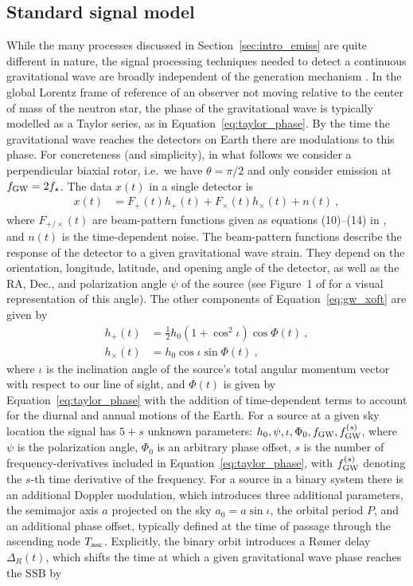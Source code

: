 \subsection{Standard signal model} \label{sec:intro_cwmethod}
While the many processes discussed in Section~\ref{sec:intro_emiss} are quite different in nature, the signal processing techniques needed to detect a continuous gravitational wave are broadly independent of the generation mechanism \citep{Owen2010,Riles2013a}. In the global Lorentz frame of reference of an observer not moving relative to the center of mass of the neutron star, the phase of the gravitational wave is typically modelled as a Taylor series, as in Equation~\eqref{eq:taylor_phase}. By the time the gravitational wave reaches the detectors on Earth there are modulations to this phase. For concreteness (and simplicity), in what follows we consider a perpendicular biaxial rotor, i.e.~we have $\theta = \pi/2$ and only consider emission at $f_{\rm GW} = 2f_\star$. The data $x(t)$ in a single detector is
\begin{align}
    x(t) &= F_+(t) h_+(t) + F_\times(t) h_\times(t) + n(t)\ ,\label{eq:gw_xoft}
\end{align}
where $F_{+/\times}(t)$ are beam-pattern functions given as equations (10)--(14) in \citet{JKS98}, and $n(t)$ is the time-dependent noise. The beam-pattern functions describe the response of the detector to a given gravitational wave strain. They depend on the orientation, longitude, latitude, and opening angle of the detector, as well as the RA, Dec., and polarization angle $\psi$ of the source (see Figure~1 of \citet{Wette2023} for a visual representation of this angle). The other components of Equation~\eqref{eq:gw_xoft} are given by
\begin{align}
    h_+(t) &= \frac{1}{2} h_0 \left(1 + \cos^2\iota \right) \cos \Phi(t)\ ,\label{eq:hplus} \\
    h_\times(t) &= h_0 \cos\iota \sin \Phi(t)\ , \label{eq:htimes}
\end{align}
where $\iota$ is the inclination angle of the source's total angular momentum vector with respect to our line of sight, and $\Phi(t)$ is given by Equation~\eqref{eq:taylor_phase} with the addition of time-dependent terms to account for the diurnal and annual motions of the Earth. For a source at a given sky location the signal has $5 + s$ unknown parameters: $h_0, \psi, \iota, \Phi_0, f_{\rm GW}, f^{(s)}_{\rm GW}$, where $\psi$ is the polarization angle, $\Phi_0$ is an arbitrary phase offset, $s$ is the number of frequency-derivatives included in Equation~\eqref{eq:taylor_phase}, with $f^{(s)}_{\rm GW}$ denoting the $s$-th time derivative of the frequency. For a source in a binary system there is an additional Doppler modulation, which introduces three additional parameters, the semimajor axis $a$ projected on the sky $a_0 = a \sin \iota$, the orbital period $P$, and an additional phase offset, typically defined at the time of passage through the ascending node $T_{\rm asc}$. Explicitly, the binary orbit introduces a Rømer delay $\Delta_R(t)$, which shifts the time at which a given gravitational wave phase reaches the SSB by 
